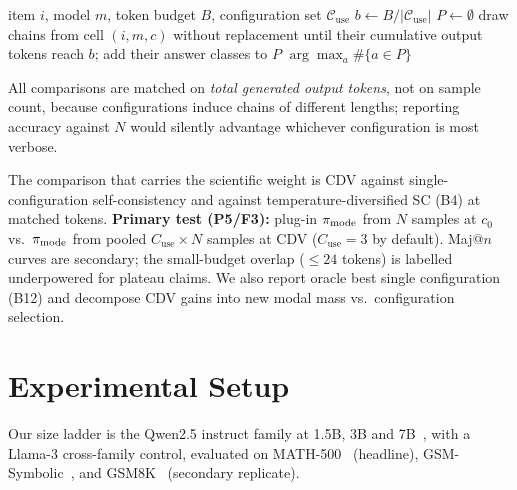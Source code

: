 \begin{algorithm}[t]
\caption{Configuration-Diversified Voting (CDV)}
\begin{algorithmic}[1]
\Require item $i$, model $m$, token budget $B$, configuration set $\mathcal{C}_{\mathrm{use}}$
\State $b \gets B / |\mathcal{C}_{\mathrm{use}}|$ 
\State $P \gets \emptyset$
  \State draw chains from cell $(i,m,c)$ without replacement until their cumulative output tokens reach $b$; add their answer classes to $P$
\EndFor
\State \Return $\arg\max_{a} \#\{a \in P\}$
\end{algorithmic}
\end{algorithm}

All comparisons are matched on \emph{total generated output tokens}, not on
sample count, because configurations induce chains of different lengths;
reporting accuracy against $N$ would silently advantage whichever configuration
is most verbose.

The comparison that carries the scientific weight is CDV against
single-configuration self-consistency and against temperature-diversified SC
(B4) at matched tokens. \textbf{Primary test (P5/F3):} plug-in $\pi_{\mathrm{mode}}$ from
$N$ samples at $c_0$ vs.\ $\pi_{\mathrm{mode}}$ from pooled $C_{\mathrm{use}}\times N$
samples at CDV ($C_{\mathrm{use}}=3$ by default). Maj@$n$ curves are secondary; the small-budget overlap
($\leq 24$ tokens) is labelled underpowered for plateau claims. We also report
oracle best single configuration (B12) and decompose CDV gains into new modal
mass vs.\ configuration selection.

\section{Experimental Setup}
\label{sec:setup}

Our size ladder is the Qwen2.5 instruct family at 1.5B, 3B and
7B~\citep{qwen25,qwen2}, with a Llama-3 cross-family control, evaluated on
MATH-500~\citep{math500} (headline), GSM-Symbolic~\citep{mirzadeh2025gsmsymbolic},
and GSM8K~\citep{cobbe2021gsm8k} (secondary replicate).


